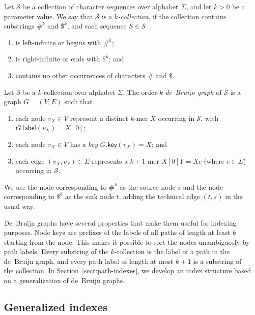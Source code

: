 \documentclass[a4paper,UKenglish]{lipics-v2016}
\newcommand{\glabel}{\ensuremath{\mathsf{label}}}
\newcommand{\gkey}{\ensuremath{\mathsf{key}}}
\newcommand{\kmer}[1]{$#1$\nobreakdash-mer}
\newcommand{\kcollection}[1]{$#1$\nobreakdash-collection}
\newcommand{\orderk}[1]{order\nobreakdash-$#1$}
\begin{document}
\begin{definition}[\kcollection{k}]
Let $\mathcal{S}$ be a collection of character sequences over alphabet $\Sigma$, and let $k > 0$ be a parameter value. We say that $\mathcal{S}$ is a \emph{\kcollection{k}}, if the collection contains substrings $\#^{k}$ and $\$^{k}$, and each sequence $S \in \mathcal{S}$
\begin{enumerate}
\item is left-infinite or begins with $\#^{k}$;
\item is right-infinite or ends with $\$^{k}$; and
\item contains no other occurrences of characters $\#$ and $\$$.
\end{enumerate}
\end{definition}

\begin{definition}
Let $\mathcal{S}$ be a \kcollection{k} over alphabet $\Sigma$. The \orderk{k} \emph{de~Bruijn graph} of $\mathcal{S}$ is a graph $G = (V, E)$ such that
\begin{enumerate}
\item each node $v_{X} \in V$ represent a distinct \kmer{k} $X$ occurring in $\mathcal{S}$, with $G.\glabel(v_{X}) = X[0]$;
\item each node $v_{X} \in V$ has a \emph{key} $G.\gkey(v_{X}) = X$; and
\item each edge $(v_{X}, v_{Y}) \in E$ represents a \kmer{k+1} $X[0]Y = Xc$ (where $c \in \Sigma$) occurring in $\mathcal{S}$.
\end{enumerate}
We use the node corresponding to $\#^{k}$ as the source node $s$ and the node corresponding to $\$^{k}$ as the sink node $t$, adding the technical edge $(t, s)$ in the usual way.
\end{definition}

De~Bruijn graphs have several properties that make them useful for indexing purposes. Node keys are prefixes of the labels of all paths of length at least $k$ starting from the node. This makes it possible to sort the nodes unambiguosly by path labels. Every substring of the \kcollection{k} is the label of a path in the de~Bruijn graph, and every path label of length at most $k+1$ is a substring of the collection. In Section~\ref{sect:path-indexes}, we develop an index structure based on a generalization of de~Bruijn graphs.

\subsection{Generalized indexes}
\end{document}
